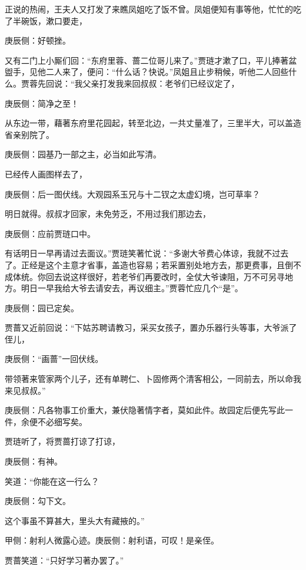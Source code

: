 \begin{parag}
    正说的热闹，王夫人又打发了来瞧凤姐吃了饭不曾。凤姐便知有事等他，忙忙的吃了半碗饭，漱口要走，\begin{note}庚辰侧：好顿挫。\end{note}又有二门上小厮们回：“东府里蓉、蔷二位哥儿来了。”贾琏才漱了口，平儿捧著盆盥手，见他二人来了，便问：“什么话？快说。”凤姐且止步稍候，听他二人回些什么。贾蓉先回说：“我父亲打发我来回叔叔：老爷们已经议定了，\begin{note}庚辰侧：简净之至！\end{note}从东边一带，藉著东府里花园起，转至北边，一共丈量准了，三里半大，可以盖造省亲别院了。\begin{note}庚辰侧：园基乃一部之主，必当如此写清。\end{note}已经传人画图样去了，\begin{note}庚辰侧：后一图伏线。大观园系玉兄与十二钗之太虚幻境，岂可草率？\end{note}明日就得。叔叔才回家，未免劳乏，不用过我们那边去，\begin{note}庚辰侧：应前贾琏口中。\end{note}有话明日一早再请过去面议。”贾琏笑著忙说：“多谢大爷费心体谅，我就不过去了。正经是这个主意才省事，盖造也容易；若采置别处地方去，那更费事，且倒不成体统。你回去说这样很好，若老爷们再要改时，全仗大爷谏阻，万不可另寻地方。明日一早我给大爷去请安去，再议细主。”贾蓉忙应几个“是”。\begin{note}庚辰侧：园已定矣。\end{note}
\end{parag}


\begin{parag}
    贾蔷又近前回说：“下姑苏聘请教习，采买女孩子，置办乐器行头等事，大爷派了侄儿，\begin{note}庚辰侧：“画蔷”一回伏线。\end{note}带领著来管家两个儿子，还有单聘仁、卜固修两个清客相公，一同前去，所以命我来见叔叔。”\begin{note}庚辰侧：凡各物事工价重大，兼伏隐著情字者，莫如此件。故园定后便先写此一件，余便不必细写矣。\end{note}贾琏听了，将贾蔷打谅了打谅，\begin{note}庚辰侧：有神。\end{note}笑道：“你能在这一行么？\begin{note}庚辰侧：勾下文。\end{note}这个事虽不算甚大，里头大有藏掖的。”\begin{note}甲侧：射利人微露心迹。庚辰侧：射利语，可叹！是亲侄。\end{note}贾蔷笑道：“只好学习著办罢了。”
\end{parag}


